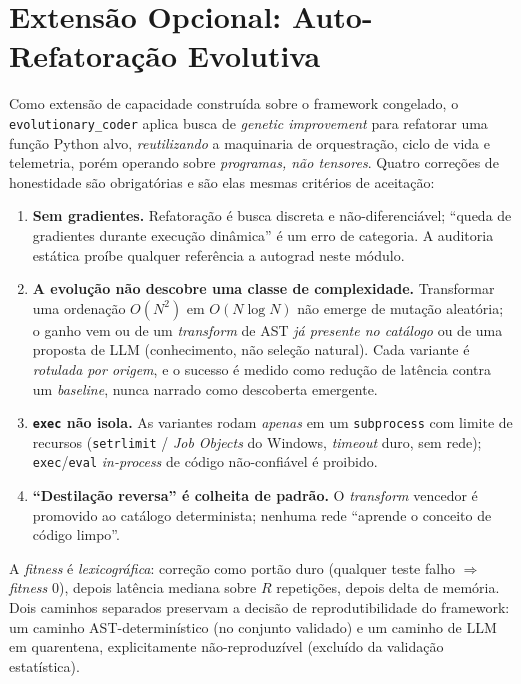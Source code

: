 \documentclass[11pt]{article}
\begin{document}
\section{Extensão Opcional: Auto-Refatoração Evolutiva}
\label{sec:evo}
Como extensão de capacidade construída sobre o framework congelado, o
\texttt{evolutionary\_coder} aplica busca de \emph{genetic improvement}
\cite{koza1992gp,petke2018gi,legoues2012genprog} para refatorar uma função Python
alvo, \emph{reutilizando} a maquinaria de orquestração, ciclo de vida e telemetria,
porém operando sobre \emph{programas, não tensores}. Quatro correções de
honestidade são obrigatórias e são elas mesmas critérios de aceitação:
\begin{enumerate}[leftmargin=1.4em,itemsep=2pt]
\item \textbf{Sem gradientes.} Refatoração é busca discreta e não-diferenciável;
``queda de gradientes durante execução dinâmica'' é um erro de categoria. A
auditoria estática proíbe qualquer referência a autograd neste módulo.
\item \textbf{A evolução não descobre uma classe de complexidade.} Transformar uma
ordenação $O(N^2)$ em $O(N\log N)$ não emerge de mutação aleatória; o ganho vem ou
de um \emph{transform} de AST \emph{já presente no catálogo} ou de uma proposta de
LLM (conhecimento, não seleção natural). Cada variante é \emph{rotulada por
origem}, e o sucesso é medido como redução de latência contra um \emph{baseline},
nunca narrado como descoberta emergente.
\item \textbf{\texttt{exec} não isola.} As variantes rodam \emph{apenas} em um
\texttt{subprocess} com limite de recursos (\texttt{setrlimit} / \emph{Job
Objects} do Windows, \emph{timeout} duro, sem rede); \texttt{exec}/\texttt{eval}
\emph{in-process} de código não-confiável é proibido.
\item \textbf{``Destilação reversa'' é colheita de padrão.} O \emph{transform}
vencedor é promovido ao catálogo determinista; nenhuma rede ``aprende o conceito
de código limpo''.
\end{enumerate}
A \emph{fitness} é \emph{lexicográfica}: correção como portão duro (qualquer teste
falho $\Rightarrow$ \emph{fitness} $0$), depois latência mediana sobre $R$
repetições, depois delta de memória. Dois caminhos separados preservam a decisão
de reprodutibilidade do framework: um caminho AST-determinístico (no conjunto
validado) e um caminho de LLM em quarentena, explicitamente não-reproduzível
(excluído da validação estatística).
\end{document}
